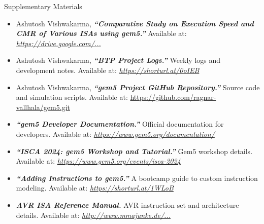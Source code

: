 \begin{frame}{Supplementary Materials}
  \begin{itemize}
    \item[{\bf [1]}] Ashutosh Vishwakarma, \textbf{\textit{“Comparative Study on Execution Speed and CMR of Various ISAs using gem5.”}} Available at: \href{https://drive.google.com/file/d/13ZroHuWGLApYXLkeWA3SBIlMh6KzfCqq/view?usp=drive_link}{\textit{https://drive.google.com/...}}
    
    \item[{\bf [2]}] Ashutosh Vishwakarma, \textbf{\textit{“BTP Project Logs.”}} Weekly logs and development notes. Available at: \href{https://shorturl.at/0oIEB}{\textit{https://shorturl.at/0oIEB}}
    
    \item[{\bf [3]}] Ashutosh Vishwakarma, \textbf{\textit{“gem5 Project GitHub Repository.”}} Source code and simulation scripts. Available at: \href{https://github.com/ragnar-vallhala/gem5.git}{https://github.com/ragnar-vallhala/gem5.git}
    
    \item[{\bf [4]}] \textbf{\textit{“gem5 Developer Documentation.”}} Official documentation for developers. Available at: \href{https://www.gem5.org/documentation/}{\textit{https://www.gem5.org/documentation/}}
    
    \item[{\bf [5]}] \textbf{\textit{“ISCA 2024: gem5 Workshop and Tutorial.”}} Gem5 workshop details. Available at: \href{https://www.gem5.org/events/isca-2024}{\textit{https://www.gem5.org/events/isca-2024}}
    
    \item[{\bf [6]}] \textbf{\textit{“Adding Instructions to gem5.”}} A bootcamp guide to custom instruction modeling. Available at: \href{https://shorturl.at/1WLoB}{\textit{https://shorturl.at/1WLoB}}
    
    \item[{\bf [7]}] \textbf{\textit{AVR ISA Reference Manual.}} AVR instruction set and architecture details. Available at: \href{http://www.mmajunke.de/doc0856.pdf}{\textit{http://www.mmajunke.de/...}}
  \end{itemize}
\end{frame}
